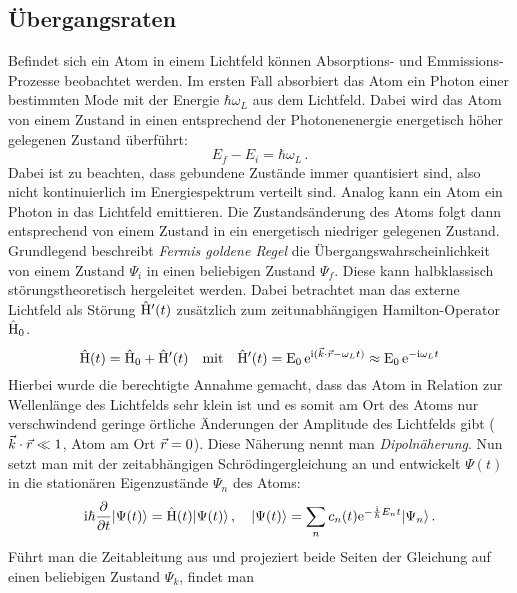 \subsection{Übergangsraten}\label{subsec:uebergangsraten}
Befindet sich ein Atom in einem Lichtfeld können Absorptions- und
Emmissions-Prozesse beobachtet werden. Im ersten Fall absorbiert das Atom ein
Photon einer bestimmten Mode mit der Energie $\hbar\omega_L$ aus dem Lichtfeld.
Dabei wird das Atom von einem Zustand in einen entsprechend der Photonenenergie
energetisch höher gelegenen Zustand überführt:
\begin{equation}\label{eq:uebergang}
	E_f-E_i=\hbar\omega_L \, .
\end{equation}
Dabei ist zu beachten, dass gebundene Zustände immer quantisiert sind, also
nicht kontinuierlich im Energiespektrum verteilt sind. Analog kann ein Atom ein
Photon in das Lichtfeld emittieren. Die Zustandsänderung des Atoms folgt dann entsprechend von einem Zustand in ein energetisch niedriger gelegenen
Zustand.\\
Grundlegend beschreibt \textit{Fermis goldene Regel} die
Übergangswahrscheinlichkeit von einem Zustand $\Psi_i$ in einen beliebigen
Zustand $\Psi_f$. Diese kann halbklassisch störungstheoretisch hergeleitet
werden. Dabei betrachtet man das externe Lichtfeld als Störung $\hat{\mathrm{H}}'(t)$
zusätzlich zum zeitunabhängigen Hamilton-Operator $\hat{\mathrm{H}}_0$.
\begin{equation}\label{eq:hamilton_stoerung}
	\hat{\mathrm{H}}(t)=\hat{\mathrm{H}}_0+\hat{\mathrm{H}}'(t)
	\quad\text{mit}\quad
	\hat{\mathrm{H}}'(t)=\operatorname{E}_0 \mathrm{e}^{\mathrm{i}(\vec{k}\cdot\vec{r}-\omega_L t)}\approx\operatorname{E}_0
	\mathrm{e}^{-\mathrm{i}\omega_L t}
\end{equation}
Hierbei wurde die berechtigte Annahme gemacht, dass das Atom in Relation zur
Wellenlänge des Lichtfelds sehr klein ist und es somit am Ort des Atoms nur
verschwindend geringe örtliche Änderungen der Amplitude des Lichtfelds gibt
($\vec{k}\cdot\vec{r}\ll 1$, Atom am Ort $\vec{r}=0$). Diese Näherung nennt man
\textit{Dipolnäherung}. Nun setzt man mit der zeitabhängigen Schrödingergleichung an und entwickelt
$\Psi(t)$ in die stationären Eigenzustände $\Psi_n$ des Atoms:
\begin{equation}\label{eq:sgl_stoerung_01}
	\mathrm{i}\hbar\frac{\partial }{\partial t}|{\Psi(t)}\rangle=\hat{\mathrm{H}}(t)|{\Psi(t)}\rangle\,,
	\quad
	|{\Psi(t)}\rangle=\sum_n{c_n(t)\mathrm{e}^{-\frac{\mathrm{i}}{\hbar} E_n
	t}|{\Psi_n}\rangle}\,.
\end{equation}
Führt man die Zeitableitung aus und projeziert beide Seiten der Gleichung auf
einen beliebigen Zustand $\Psi_k$, findet man
